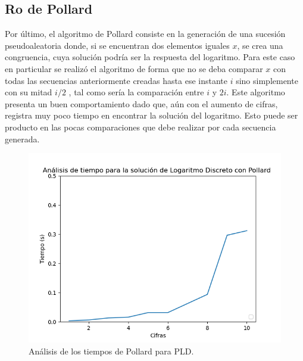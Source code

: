 \documentclass{article}
\begin{document}
    \subsection{Ro de Pollard}
    Por último, el algoritmo de Pollard consiste en la generación de una sucesión pseudoaleatoria donde, si se encuentran dos elementos iguales \begin{math}x\end{math}, se crea una congruencia, cuya solución podría ser la respuesta del logaritmo. Para este caso en particular se realizó el algoritmo de forma que no se deba comparar \begin{math}x\end{math} con todas las secuencias anteriormente creadas hasta ese instante \begin{math}i\end{math} sino simplemente con su mitad \begin{math}i/2\end{math} , tal como sería la comparación entre \begin{math}i\end{math} y \begin{math}2i\end{math}.
    Este algoritmo presenta un buen comportamiento dado que, aún con el aumento de cifras, registra muy poco tiempo en encontrar la solución del logaritmo. Esto puede ser producto en las pocas comparaciones que debe realizar por cada secuencia generada.
     \begin{figure}[ht!]
        \centering
        \includegraphics[scale=0.7]{Figure_9}
        \caption{Análisis de los tiempos de Pollard para PLD.}
        \label{fig:Figure_6}
    \end{figure}
    \newpage
    
\end{document}
